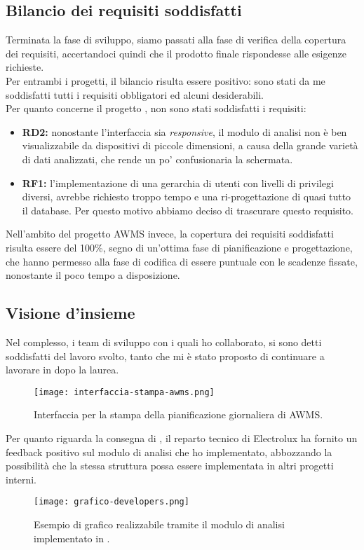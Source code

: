 \subsection{Bilancio dei requisiti soddisfatti}
Terminata la fase di sviluppo, siamo passati alla fase di verifica della copertura dei requisiti, accertandoci quindi che il prodotto finale rispondesse alle esigenze richieste.\\
Per entrambi i progetti, il bilancio risulta essere positivo: sono stati da me soddisfatti tutti i requisiti obbligatori ed alcuni desiderabili.\\
Per quanto concerne il progetto \DS{}, non sono stati soddisfatti i requisiti:
\begin{itemize}
    \item \textbf{RD2:} nonostante l'interfaccia sia \textit{responsive}, il modulo di analisi non è ben visualizzabile da dispositivi di piccole dimensioni, a causa della grande varietà di dati analizzati, che rende un po' confusionaria la schermata.  
    \item \textbf{RF1:} l'implementazione di una gerarchia di utenti con livelli di privilegi diversi, avrebbe richiesto troppo tempo e una ri-progettazione di quasi tutto il database. Per questo motivo abbiamo deciso di trascurare questo requisito.
\end{itemize}
Nell'ambito del progetto AWMS invece, la copertura dei requisiti soddisfatti risulta essere del 100\%{}, segno di un'ottima fase di pianificazione e progettazione, che hanno permesso alla fase di codifica di essere puntuale con le scadenze fissate, nonostante il poco tempo a disposizione.
\subsection{Visione d'insieme}
Nel complesso, i team di sviluppo con i quali ho collaborato, si sono detti soddisfatti del lavoro svolto, tanto che mi è stato proposto di continuare a lavorare in \AD{} dopo la laurea.\\
\begin{figure}[h]
\centering
\texttt{[image: interfaccia-stampa-awms.png]} 
\caption{Interfaccia per la stampa della pianificazione giornaliera di AWMS.}
\end{figure}

Per quanto riguarda la consegna di \DS{}, il reparto tecnico di Electrolux ha fornito un feedback positivo sul modulo di analisi che ho implementato, abbozzando la possibilità che la stessa struttura possa essere implementata in altri progetti interni. 
\begin{figure}[h]
\centering
\texttt{[image: grafico-developers.png]} 
\caption{Esempio di grafico realizzabile tramite il modulo di analisi implementato in \DS{}.}
\end{figure}

